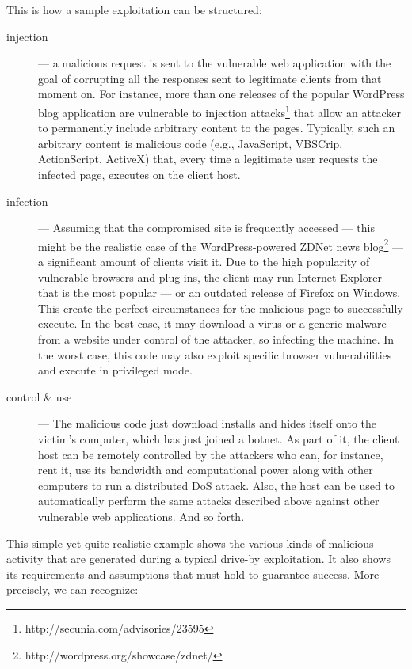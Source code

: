 \begin{example}
This is how a sample exploitation can be structured:
\begin{description}
\item [injection] --- a malicious request is sent to the vulnerable web application with the goal of corrupting all the responses sent to legitimate clients from that moment on. For instance, more than one releases of the popular \textsf{WordPress} blog application are vulnerable to injection attacks\footnote{http://secunia.com/advisories/23595} that allow an attacker to permanently include arbitrary content to the pages. Typically, such an arbitrary content is malicious code (e.g., JavaScript, VBSCrip, ActionScript, ActiveX) that, every time a legitimate user requests the infected page, executes on the client host.
\item [infection] --- Assuming that the compromised site is frequently accessed --- this might be the realistic case of the \textsf{WordPress}-powered \textsf{ZDNet} news blog\footnote{http://wordpress.org/showcase/zdnet/} --- a significant amount of clients visit it. Due to the high popularity of vulnerable browsers and plug-ins, the client may run \textsf{Internet Explorer} --- that is the most popular --- or an outdated release of \textsf{Firefox} on \textsf{Windows}. This create the perfect circumstances for the malicious page to successfully execute. In the best case, it may download a virus or a generic malware from a website under control of the attacker, so infecting the machine. In the worst case, this code may also exploit specific browser vulnerabilities and execute in privileged mode.
\item [control \& use] --- The malicious code just download installs and hides itself onto the victim's computer, which has just joined a botnet. As part of it, the client host can be remotely controlled by the attackers who can, for instance, rent it, use its bandwidth and computational power along with other computers to run a distributed \ac{DoS} attack. Also, the host can be used to automatically perform the same attacks described above against other vulnerable web applications. And so forth. \end{description}
\end{example}

This simple yet quite realistic example shows the various kinds of malicious activity that are generated during a typical drive-by exploitation. It also shows its requirements and assumptions that must hold to guarantee success. More precisely, we can recognize:


